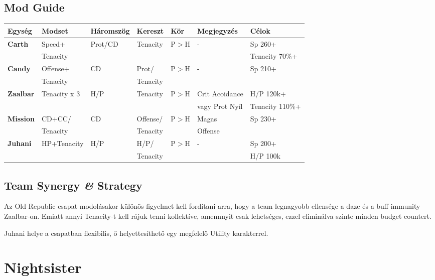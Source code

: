 \documentclass[11pt]{report}
\begin{document}
\section{Mod Guide}
\begin{center}
    \begin{tabular}{|l | l | l | l | l | l | l |}
        \hline
        Egység & Modset & Háromszög & Kereszt & Kör & Megjegyzés & Célok\\ \hline
        \textbf{Carth} & Speed+ & Prot/CD & Tenacity & P$>$H & - & Sp 260+\\
        & Tenacity &  &  &  &  & Tenacity 70\%+\\ \hline
        \textbf{Candy} & Offense+ & CD & Prot/ & P$>$H & - & Sp 210+\\
        & Tenacity &  & Tenacity &  &  & \\ \hline
        \textbf{Zaalbar} & Tenacity x 3 & H/P & Tenacity & P$>$H & Crit Acoidance  & H/P 120k+\\
        &  &  &  &  & vagy Prot Nyíl & Tenacity 110\%+\\ \hline
        \textbf{Mission} & CD+CC/ & CD & Offense/ & P$>$H & Magas & Sp 230+\\
        & Tenacity &  & Tenacity &  & Offense & \\ \hline
        \textbf{Juhani} & HP+Tenacity & H/P & H/P/ & P$>$H & - & Sp 200+\\
        &  &  & Tenacity &  &  & H/P 100k\\ \hline
    \end{tabular}
\end{center}
\section{Team Synergy \textit{\&} Strategy}
Az Old Republic csapat modolásakor különös figyelmet kell fordítani arra, hogy a team legnagyobb ellensége a daze és a buff immunity Zaalbar-on. Emiatt annyi Tenacity-t kell rájuk tenni kollektíve, amennnyit csak lehetséges, ezzel eliminálva szinte minden budget countert.\par
Juhani helye a csapatban flexibilis, ő helyettesíthető egy megfelelő Utility karakterrel.

\chapter{Nightsister}
\end{document}
